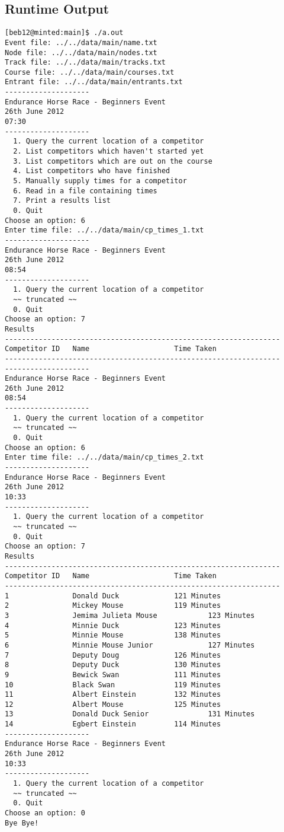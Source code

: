 \documentclass[pdftex,12pt,a4paper]{article}
\begin{document}
\subsection{Runtime Output}
\begin{verbatim}
[beb12@minted:main]$ ./a.out
Event file: ../../data/main/name.txt
Node file: ../../data/main/nodes.txt
Track file: ../../data/main/tracks.txt
Course file: ../../data/main/courses.txt
Entrant file: ../../data/main/entrants.txt
--------------------
Endurance Horse Race - Beginners Event
26th June 2012
07:30
--------------------
  1. Query the current location of a competitor
  2. List competitors which haven't started yet
  3. List competitors which are out on the course
  4. List competitors who have finished
  5. Manually supply times for a competitor
  6. Read in a file containing times
  7. Print a results list
  0. Quit
Choose an option: 6
Enter time file: ../../data/main/cp_times_1.txt
--------------------
Endurance Horse Race - Beginners Event
26th June 2012
08:54
--------------------
  1. Query the current location of a competitor
  ~~ truncated ~~
  0. Quit
Choose an option: 7
Results
-----------------------------------------------------------------
Competitor ID   Name                    Time Taken
-----------------------------------------------------------------
--------------------
Endurance Horse Race - Beginners Event
26th June 2012
08:54
--------------------
  1. Query the current location of a competitor
  ~~ truncated ~~
  0. Quit
Choose an option: 6
Enter time file: ../../data/main/cp_times_2.txt
--------------------
Endurance Horse Race - Beginners Event
26th June 2012
10:33
--------------------
  1. Query the current location of a competitor
  ~~ truncated ~~
  0. Quit
Choose an option: 7
Results
-----------------------------------------------------------------
Competitor ID   Name                    Time Taken
-----------------------------------------------------------------
1               Donald Duck             121 Minutes
2               Mickey Mouse            119 Minutes
3               Jemima Julieta Mouse            123 Minutes
4               Minnie Duck             123 Minutes
5               Minnie Mouse            138 Minutes
6               Minnie Mouse Junior             127 Minutes
7               Deputy Doug             126 Minutes
8               Deputy Duck             130 Minutes
9               Bewick Swan             111 Minutes
10              Black Swan              119 Minutes
11              Albert Einstein         132 Minutes
12              Albert Mouse            125 Minutes
13              Donald Duck Senior              131 Minutes
14              Egbert Einstein         114 Minutes
--------------------
Endurance Horse Race - Beginners Event
26th June 2012
10:33
--------------------
  1. Query the current location of a competitor
  ~~ truncated ~~
  0. Quit
Choose an option: 0
Bye Bye!
\end{verbatim}
\end{document}
